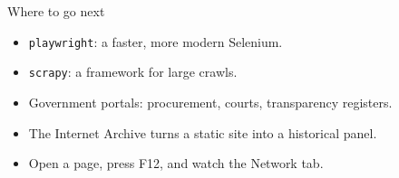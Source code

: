\documentclass[11pt,aspectratio=169]{beamer}
\newenvironment{wideitemize}
  {\begin{itemize}\setlength{\itemsep}{10pt}}
  {\end{itemize}}
\begin{document}
\begin{frame}{Where to go next}
\begin{wideitemize}
  \item \texttt{playwright}: a faster, more modern Selenium.
  \item \texttt{scrapy}: a framework for large crawls.
  \item Government portals: procurement, courts, transparency registers.
  \item The Internet Archive turns a static site into a historical panel.
  \item Open a page, press F12, and watch the Network tab.
\end{wideitemize}
\end{frame}
\end{document}
